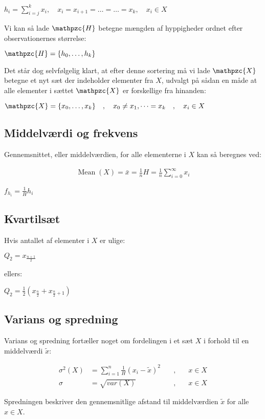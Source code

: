 \documentclass{article}
\newcommand{\mellemrum}{\vspace{2 ex}}
\newcommand{\cent}[1]{ \mellemrum \begin{center} #1\end{center} \mellemrum }
\newcommand{\mAlign}[1]{\begin{align*}#1\end{align*}}
\newcommand{\op}[1]{\operatorname{#1}}
\newcommand{\summation}[2]{\sum\limits_{#1}^{#2}}
\newcommand{\script}[1]{\mathpzc{#1}}
\begin{document}
	\cent{$ h_i = \summation{i=j}{k} x_i, \quad x_i = x_{i +1 } = \dots = \dots = x_k, \quad x_i\in X $}
	
	Vi kan så lade $ \script{H} $ betegne mængden af hyppigheder ordnet efter observationernes størrelse:
	
	\cent{$ \script{H} = \{ h_0,\dots,h_k \} $}
	
	Det står dog selvfølgelig klart, at efter denne sortering må vi lade $\script{X}$ betegne et nyt sæt der indeholder elementer fra $X$, udvalgt på sådan en måde at alle elementer i sættet $\script{X}$ er forskellige fra hinanden:
	
	\cent{$ \script{X} = \{ x_0,\dots,x_k \} \quad , \quad x_0 \neq x_1, \dots = x_k \quad , \quad x_i \in X $}
	
	\subsection{Middelværdi og frekvens}
	
	Gennemsnittet, eller middelværdien, for alle elementerne i $X$ kan så beregnes ved:
	
	
	\mAlign{\op{Mean}(X) = \bar{x} = \frac{1}{n}H = \frac{1}{n} \summation{i = 0}{\infty} x_i}
	
	\cent{$ f_{h_i} = \frac{1}{H} h_i $}
	
	
	\subsection{Kvartilsæt}
	
	Hvis antallet af elementer i $X$ er ulige:
	
	\cent{$ Q_2 = x_{\frac{n+1}{2}} $}
	
	ellers:
	
	\cent{$ Q_2 = \frac{1}{2}(x_{\frac{n}{2}} + x_{\frac{n}{2} + 1}) $}
	
	\subsection{Varians og spredning}
	
	Varians og spredning fortæller noget om fordelingen i et sæt $ X $ i forhold til en middelværdi $\tilde{x}$:
	
	\mAlign{\sigma^2(X) &= \summation{i = 1}{n} \frac{1}{H} (x_i-\tilde{x})^2 &\quad , &\quad x \in X\\
		\sigma &= \sqrt{var(X)} &\quad , &\quad x \in X}
	
	
	Spredningen beskriver den gennemsnitlige afstand til middelværdien $ \tilde{x} $ for alle $ x \in X$.
	
\end{document}
